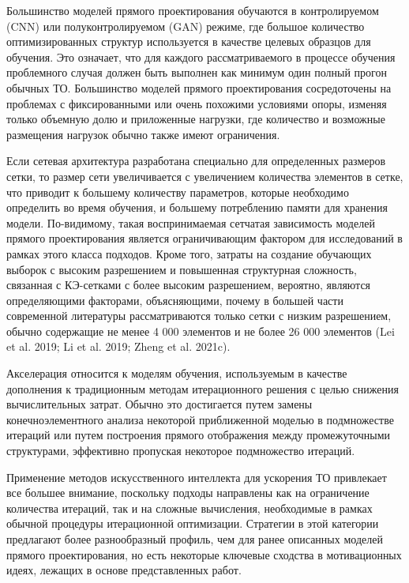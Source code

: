 Большинство моделей прямого проектирования обучаются в контролируемом (CNN) или полуконтролируемом (GAN) режиме, где большое количество оптимизированных структур используется в качестве целевых образцов для обучения. Это означает, что для каждого рассматриваемого в процессе обучения проблемного случая должен быть выполнен как минимум один полный прогон обычных ТО. Большинство моделей прямого проектирования сосредоточены на проблемах с фиксированными или очень похожими условиями опоры, изменяя только объемную долю и приложенные нагрузки, где количество и возможные размещения нагрузок обычно также имеют ограничения.

Если сетевая архитектура разработана специально для определенных размеров сетки, то размер сети увеличивается с увеличением количества элементов в сетке, что приводит к большему количеству параметров, которые необходимо определить во время обучения, и большему потреблению памяти для хранения модели. По-видимому, такая воспринимаемая сетчатая зависимость моделей прямого проектирования является ограничивающим фактором для исследований в рамках этого класса подходов. Кроме того, затраты на создание обучающих выборок с высоким разрешением и повышенная структурная сложность, связанная с КЭ-сетками с более высоким разрешением, вероятно, являются определяющими факторами, объясняющими, почему в большей части современной литературы рассматриваются только сетки с низким разрешением, обычно содержащие не менее 4 000 элементов и не более 26 000 элементов (Lei et al. 2019; Li et al. 2019; Zheng et al. 2021c).








Акселерация относится к моделям обучения, используемым в качестве дополнения к традиционным методам итерационного решения с целью снижения вычислительных затрат. Обычно это достигается путем замены конечноэлементного анализа некоторой приближенной моделью в подмножестве итераций или путем построения прямого отображения между промежуточными структурами, эффективно пропуская некоторое подмножество итераций.

Применение методов искусственного интеллекта для ускорения ТО привлекает все большее внимание, поскольку подходы направлены как на ограничение количества итераций, так и на сложные вычисления, необходимые в рамках обычной процедуры итерационной оптимизации. Стратегии в этой категории предлагают более разнообразный профиль, чем для ранее описанных моделей прямого проектирования, но есть некоторые ключевые сходства в мотивационных идеях, лежащих в основе представленных работ.

